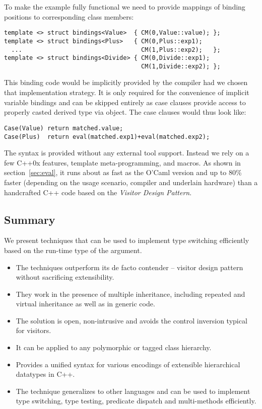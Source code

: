 \noindent
To make the example fully functional we need to provide mappings of binding 
positions to corresponding class members:

\begin{lstlisting}[keepspaces,columns=flexible]
template <> struct bindings<Value>  { CM(0,Value::value); };
template <> struct bindings<Plus>   { CM(0,Plus::exp1); 
  ...                                 CM(1,Plus::exp2);   };
template <> struct bindings<Divide> { CM(0,Divide::exp1); 
                                      CM(1,Divide::exp2); };
\end{lstlisting}

\noindent
This binding code would be implicitly provided by the compiler had we chosen 
that implementation strategy. It is only required for the convenience of 
implicit variable bindings and can be skipped entirely as case clauses provide 
access to properly casted derived type via  object. The case 
clauses would thus look like:

\begin{lstlisting}[keepspaces,columns=flexible]
Case(Value) return matched.value;
Case(Plus)  return eval(matched.exp1)+eval(matched.exp2);
\end{lstlisting}

\noindent
The syntax is provided without any external tool support. Instead we rely on a 
few C++0x features\cite{C++0x}, template meta-programming, and macros. As shown 
in section~\ref{sec:eval}, it runs about as fast as the O'Caml version and up to 
80\% faster (depending on the usage scenario, compiler and underlain hardware) 
than a handcrafted C++ code based on the \emph{Visitor Design Pattern}.

\subsection{Summary}

We present techniques that can be used to implement type switching efficiently 
based on the run-time type of the argument.

  \begin{itemize}
  \setlength{\itemsep}{0pt}
  \setlength{\parskip}{0pt}
  \item The techniques outperform its de facto contender -- visitor design 
        pattern without sacrificing extensibility.
  \item They work in the presence of multiple inheritance, including repeated and 
        virtual inheritance as well as in generic code.
  \item The solution is open, non-intrusive and avoids the control inversion 
        typical for visitors. 
  \item It can be applied to any polymorphic or tagged class hierarchy.
  \item Provides a unified syntax for various encodings of extensible 
        hierarchical datatypes in C++.
  \item The technique generalizes to other languages and can be used to 
        implement type switching, type testing, predicate dispatch and 
        multi-methods efficiently.
  \end{itemize}

